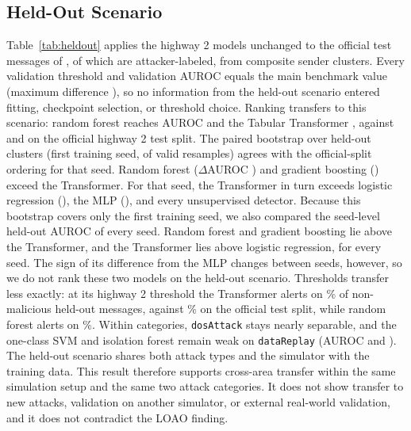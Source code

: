 \documentclass[preprint,12pt,numafflabel]{elsarticle}
\begin{document}
\subsection{Held-Out Scenario}
Table~\ref{tab:heldout} applies the highway 2 models unchanged to the \ResHeldoutRecords{} official test messages of \texttt{\ResHeldoutScenario}, of which \ResHeldoutAttacker{} are attacker-labeled, from \ResHeldoutClusters{} composite sender clusters. Every validation threshold and validation AUROC equals the main benchmark value (maximum difference \ResHeldoutThresholdMaxDelta), so no information from the held-out scenario entered fitting, checkpoint selection, or threshold choice. Ranking transfers to this scenario: random forest reaches AUROC \ResHeldoutRandomForestAUROC{} and the Tabular Transformer \ResHeldoutTabTransformerAUROC, against \ResRandomForestAUROC{} and \ResTabTransformerAUROC{} on the official highway 2 test split. The paired bootstrap over held-out clusters (first training seed, \ResHeldoutBootValid{} of \ResHeldoutBootRequested{} valid resamples) agrees with the official-split ordering for that seed. Random forest ($\Delta$AUROC \ResHeldoutRandomForestDeltaAUROCCI) and gradient boosting (\ResHeldoutHGBDeltaAUROCCI) exceed the Transformer. For that seed, the Transformer in turn exceeds logistic regression (\ResHeldoutLogRegDeltaAUROCCI), the MLP (\ResHeldoutMLPDeltaAUROCCI), and every unsupervised detector. Because this bootstrap covers only the first training seed, we also compared the seed-level held-out AUROC of every seed. Random forest and gradient boosting lie above the Transformer, and the Transformer lies above logistic regression, for every seed. The sign of its difference from the MLP changes between seeds, however, so we do not rank these two models on the held-out scenario. Thresholds transfer less exactly: at its highway 2 threshold the Transformer alerts on \ResHeldoutTabTransformerFAR\% of non-malicious held-out messages, against \ResTabTransformerFAR\% on the official test split, while random forest alerts on \ResHeldoutRandomForestFAR\%. Within categories, \texttt{dosAttack} stays nearly separable, and the one-class SVM and isolation forest remain weak on \texttt{dataReplay} (AUROC \ResHeldoutReplayOneClassSVMAUROC{} and \ResHeldoutReplayIsolationForestAUROC). The held-out scenario shares both attack types and the simulator with the training data. This result therefore supports cross-area transfer within the same simulation setup and the same two attack categories. It does not show transfer to new attacks, validation on another simulator, or external real-world validation, and it does not contradict the LOAO finding.
\end{document}
